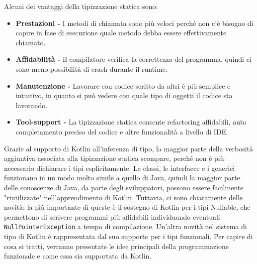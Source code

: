 Alcuni dei vantaggi della tipizzazione statica sono:
\begin{itemize}
  \item {\bfseries Prestazioni -} I metodi di chiamata sono più veloci perché non c'è bisogno di capire in fase
        di esecuzione quale metodo debba essere effettivamente chiamato.
  \item {\bfseries Affidabilità -} Il compilatore verifica la correttezza del programma, quindi ci sono meno
        possibilità di crash durante il runtime.
  \item {\bfseries Manutenzione -} Lavorare con codice scritto da altri è più semplice e intuitivo, in quanto
        si può vedere con quale tipo di oggetti il codice sta lavorando.
  \item {\bfseries Tool-support -} La tipizzazione statica consente refactoring affidabili, auto completamento
        preciso del codice e altre funzionalità a livello di IDE.
\end{itemize}
Grazie al supporto di Kotlin all'inferenza di tipo, la maggior parte della verbosità aggiuntiva associata
alla tipizzazione statica scompare, perché non è più necessario dichiarare i tipi esplicitamente.
Le classi, le interfacce e i generici funzionano in un modo molto simile a quello di Java, quindi la
maggior parte delle conoscenze di Java, da parte degli sviluppatori, possono essere facilmente "riutilizzate"
nell’apprendimento di Kotlin. Tuttavia, ci sono chiaramente delle novità: la più importante di queste è il sostegno
di Kotlin per i tipi Nullable, che permettono di scrivere programmi più affidabili individuando eventuali
\texttt{NullPointerException} a tempo di compilazione. Un'altra novità nel sistema di tipo di Kotlin è rappresentata
dal suo supporto per i tipi funzionali. Per capire di cosa si tratti, verranno presentate le idee principali
della programmazione funzionale e come essa sia supportata da Kotlin.\\

